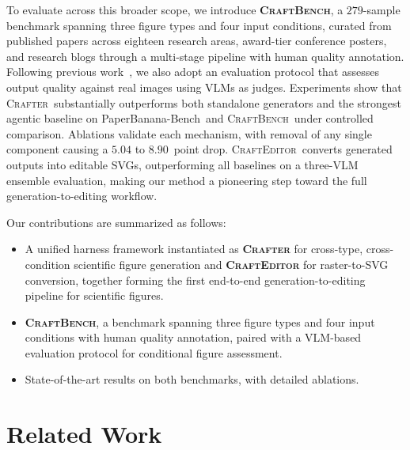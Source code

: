 \documentclass{article}
\newcommand{\Crafter}{\textsc{Crafter}\xspace}
\newcommand{\Editor}{\textsc{CraftEditor}\xspace}
\newcommand{\CrafterBench}{\textsc{CraftBench}\xspace}
\newcommand{\PaperBananaBench}{PaperBanana-Bench\xspace}
\begin{document}
To evaluate across this broader scope, we introduce \textbf{\CrafterBench}, a $279$-sample benchmark spanning three figure types and four input conditions, curated from published papers across eighteen research areas, award-tier conference posters, and research blogs through a multi-stage pipeline with human quality annotation. Following previous work~\citep{zhu2026paperbanana}, we also adopt an evaluation protocol that assesses output quality against real images using VLMs as judges. Experiments show that \Crafter\ substantially outperforms both standalone generators and the strongest agentic baseline on \PaperBananaBench\ and \CrafterBench\ under controlled comparison. Ablations validate each mechanism, with removal of any single component causing a $5.04$ to $8.90$~point drop. \Editor\ converts generated outputs into editable SVGs, outperforming all baselines on a three-VLM ensemble evaluation, making our method a pioneering step toward the full generation-to-editing workflow.

Our contributions are summarized as follows:
\begin{itemize}[leftmargin=1.2em, itemsep=0pt, topsep=0pt, parsep=0pt]
  \item A unified harness framework instantiated as \textbf{\Crafter}
  for cross-type, cross-condition scientific figure generation and
  \textbf{\Editor} for raster-to-SVG conversion, together forming the
  first end-to-end generation-to-editing pipeline for scientific figures.
  \item \textbf{\CrafterBench}, a benchmark spanning three
  figure types and four input conditions with human quality annotation,
  paired with a VLM-based evaluation protocol for conditional figure
  assessment.
  \item State-of-the-art results on both benchmarks, with detailed
  ablations.
\end{itemize}


\section{Related Work}
\label{sec:related}
 
\end{document}
